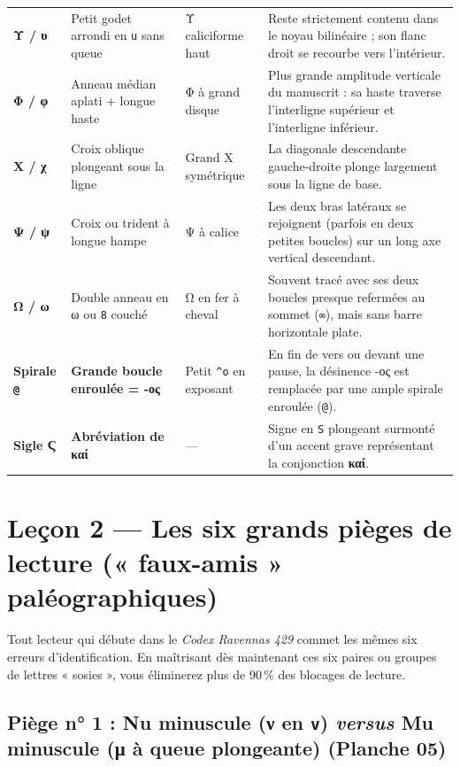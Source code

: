 \documentclass[11pt,a4paper]{article}
\begin{document}
\begin{longtable}{@{}p{1.6cm}p{3.8cm}p{3.4cm}p{7.2cm}@{}}
\addlinespace
\textbf{Υ / υ} & Petit godet arrondi en \texttt{u} sans queue & Υ caliciforme haut & Reste strictement contenu dans le noyau bilinéaire ; son flanc droit se recourbe vers l'intérieur. \\
\addlinespace
\textbf{Φ / φ} & Anneau médian aplati + longue haste & Φ à grand disque & Plus grande amplitude verticale du manuscrit : sa haste traverse l'interligne supérieur et l'interligne inférieur. \\
\addlinespace
\textbf{Χ / χ} & Croix oblique plongeant sous la ligne & Grand Χ symétrique & La diagonale descendante gauche-droite plonge largement sous la ligne de base. \\
\addlinespace
\textbf{Ψ / ψ} & Croix ou trident à longue hampe & Ψ à calice & Les deux bras latéraux se rejoignent (parfois en deux petites boucles) sur un long axe vertical descendant. \\
\addlinespace
\textbf{Ω / ω} & Double anneau en ω ou \texttt{8} couché & Ω en fer à cheval & Souvent tracé avec ses deux boucles presque refermées au sommet (\texttt{∞}), mais sans barre horizontale plate. \\
\addlinespace
\textbf{Spirale \texttt{@}} & \textbf{Grande boucle enroulée = -ος} & Petit \texttt{\^{}ο} en exposant & En fin de vers ou devant une pause, la désinence -ος est remplacée par une ample spirale enroulée (\texttt{@}). \\
\addlinespace
\textbf{Sigle Ϛ} & \textbf{Abréviation de καί} & — & Signe en \texttt{S} plongeant surmonté d'un accent grave représentant la conjonction \textbf{καί}. \\
\end{longtable}

\newpage
\section{Leçon 2 — Les six grands pièges de lecture (« faux-amis » paléographiques)}

Tout lecteur qui débute dans le \textit{Codex Ravennas 429} commet les mêmes six erreurs d'identification. En maîtrisant dès maintenant ces six paires ou groupes de lettres « sosies », vous éliminerez plus de 90\,\% des blocages de lecture.

\subsection{Piège n° 1 : Nu minuscule (ν en \texttt{v}) \textit{versus} Mu minuscule (μ à queue plongeante) (Planche 05)}
\end{document}
